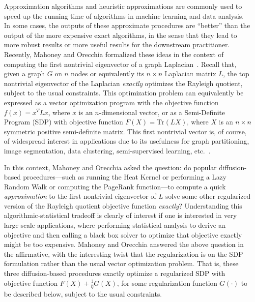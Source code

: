 \documentclass[12pt]{article}
\theoremstyle{plain}
\begin{document}
Approximation algorithms and heuristic approximations are commonly used to
speed up the running time of algorithms in machine learning and data
analysis.
In some cases, the outputs of these approximate procedures are ``better''
than the output of the more expensive exact algorithms, in the sense that
they lead to more robust results or more useful results for the downstream
practitioner.
Recently, Mahoney and Orecchia formalized these ideas in the context of
computing the first nontrivial eigenvector of a graph
Laplacian~\cite{MO11-implementing}.
Recall that, given a graph $G$ on $n$ nodes or equivalently its $n \times n$
Laplacian matrix $L$, the top nontrivial eigenvector of the Laplacian
\emph{exactly} optimizes the Rayleigh quotient, subject to the usual
constraints.
This optimization problem can equivalently be expressed as a vector
optimization program with the objective function $f(x) = x^TLx$,
where $x$ is an $n$-dimensional vector, or as a Semi-Definite Program (SDP)
with objective function $F(X)=\mathrm{Tr}(L X)$, where $X$ is an $n \times n$
symmetric positive semi-definite matrix.
This first nontrivial vector is, of course, of widespread interest in
applications due to its usefulness for graph partitioning, image
segmentation, data clustering, semi-supervised learning, etc.~\cite{spielman96_spectral,guatterymiller98,ShiMalik00_NCut,BN03,Joa03,LLDM09_communities_IM}.

In this context, Mahoney and Orecchia asked the question: do popular
diffusion-based procedures---such as running the Heat Kernel or performing a
Lazy Random Walk or computing the PageRank function---to compute a quick
\emph{approximation} to the first nontrivial eigenvector of $L$ solve some
other regularized version of the Rayleigh quotient objective function
\emph{exactly}?
Understanding this algorithmic-statistical tradeoff is clearly of interest
if one is interested in very large-scale applications, where performing
statistical analysis to derive an objective and then calling a black box
solver to optimize that objective exactly might be too expensive.
Mahoney and Orecchia answered the above question in the affirmative, with
the interesting twist that the regularization is on the SDP formulation
rather than the usual vector optimization problem.
That is, these three diffusion-based procedures exactly optimize a 
regularized SDP with objective function $F(X)+ \tfrac{1}{\eta} G(X)$, for 
some regularization function $G(\cdot)$ to be described below, subject to 
the usual constraints.
\end{document}
